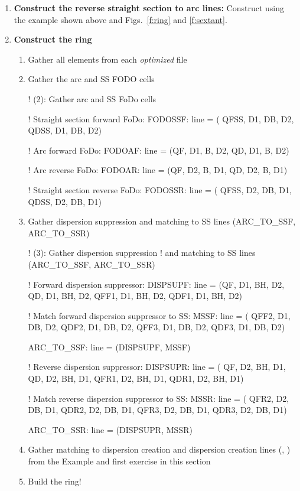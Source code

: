 \documentclass{hitec}     %
\begin{document}
{\begin{enumerate}[leftmargin=*]
\item \textbf{Construct the reverse straight section to arc lines:} Construct  using the example shown above and Figs.~\ref{f:ring} and \ref{f:sextant}.
%
\item \textbf{Construct the ring}
%
\begin{enumerate}[label*=\arabic*.]
\item Gather all elements from each \textit{optimized} file
\item Gather the arc and SS FODO cells
\begin{code}
! (2): Gather arc and SS FoDo cells

! Straight section forward FoDo:
FODOSSF: line = ( QFSS, D1, DB, D2, QDSS, D1, DB, D2)

! Arc forward FoDo:
FODOAF: line = (QF, D1, B, D2, QD, D1, B, D2)

! Arc reverse FoDo:
FODOAR: line = (QF, D2, B, D1, QD, D2, B, D1)

! Straight section reverse FoDo:
FODOSSR: line = ( QFSS, D2, DB, D1, QDSS, D2, DB, D1)
\end{code}
%
\item Gather dispersion suppression and matching to SS lines (ARC\_TO\_SSF, ARC\_TO\_SSR)
\begin{code}
! (3): Gather dispersion suppression 
!      and matching to SS lines (ARC_TO_SSF, ARC_TO_SSR)

! Forward dispersion suppressor:
DISPSUPF: line = (QF, D1, BH, D2, QD, D1, BH, D2, 
                  QFF1, D1, BH, D2, QDF1, D1, BH, D2)

! Match forward dispersion suppressor to SS:
MSSF: line = ( QFF2, D1, DB, D2, QDF2, D1, DB, D2,  
               QFF3, D1, DB, D2, QDF3, D1, DB, D2)

ARC_TO_SSF: line = (DISPSUPF, MSSF)

! Reverse dispersion suppressor:
DISPSUPR: line = ( QF, D2, BH, D1, QD, D2, BH, D1, 
                   QFR1, D2, BH, D1, QDR1, D2, BH, D1)

! Match reverse dispersion suppressor to SS:
MSSR: line = ( QFR2, D2, DB, D1, QDR2, D2, DB, D1,  
               QFR3, D2, DB, D1, QDR3, D2, DB, D1)

ARC_TO_SSR: line = (DISPSUPR, MSSR)
    \end{code}
        \item Gather matching to dispersion creation and dispersion creation lines (, ) from the Example and first exercise in this section
        \item Build the ring!
  \end{enumerate}


\end{enumerate}}
\end{document}
